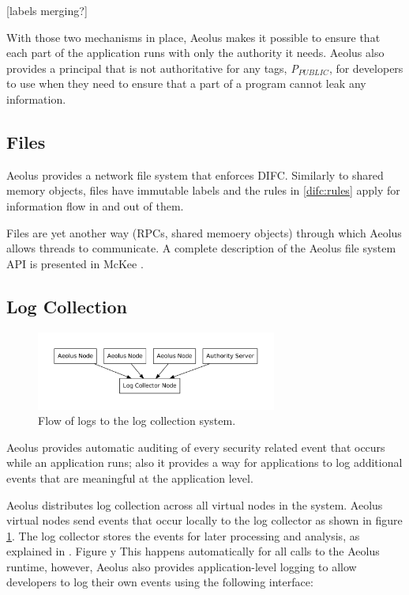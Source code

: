 [labels merging?]

With those two mechanisms in place, Aeolus makes it possible to ensure that each part of the application runs with only the authority it needs. Aeolus also provides a principal that is not authoritative for any tags, \emph{P$_{PUBLIC}$}, for developers to use when they need to ensure that a part of a program cannot leak any information.

\subsection{Files}

Aeolus provides a network file system that enforces DIFC. Similarly to shared memory objects, files have immutable labels and the rules in \ref{difc:rules} apply for information flow in and out of them.

Files are yet another way (RPCs, shared memoery objects) through which Aeolus allows threads to communicate. A complete description of the Aeolus file system API is presented in McKee \cite{mckee}.

\subsection{Log Collection}

\begin{figure}[h]
\centering
\includegraphics[height=7em]{figures/event-logging-overview}
\caption{Flow of logs to the log collection system.}
\label{fig:log-flow}
\end{figure}

Aeolus provides automatic auditing of every security related event that occurs while an application runs; also it provides a way for applications to log additional events that are meaningful at the application level.

Aeolus distributes log collection across all virtual nodes in the system. Aeolus virtual nodes send events that occur locally to the log collector as shown in figure \ref{fig:log-flow}. The log collector stores the events for later processing and analysis, as explained in \cite{blanks}. Figure y This happens automatically for all calls to the Aeolus runtime, however, Aeolus also provides application-level logging to allow developers to log their own events using the following interface:

